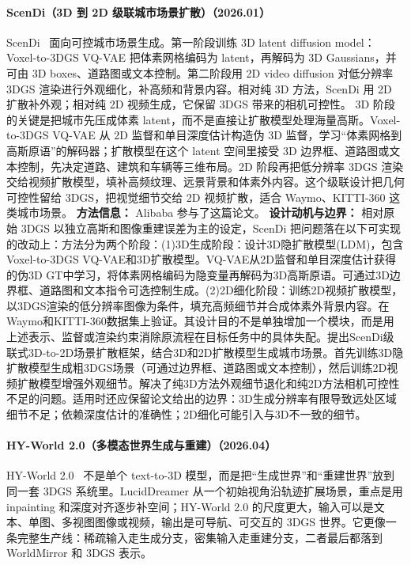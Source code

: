 \paragraph{ScenDi（3D 到 2D 级联城市场景扩散）（2026.01）}
ScenDi~\cite{2601_15221} 面向可控城市场景生成。第一阶段训练 3D latent diffusion model：Voxel-to-3DGS VQ-VAE 把体素网格编码为 latent，再解码为 3D Gaussians，并可由 3D boxes、道路图或文本控制。第二阶段用 2D video diffusion 对低分辨率 3DGS 渲染进行外观细化，补高频和背景内容。相对纯 3D 方法，ScenDi 用 2D 扩散补外观；相对纯 2D 视频生成，它保留 3DGS 带来的相机可控性。
3D 阶段的关键是把城市先压成体素 latent，而不是直接让扩散模型处理海量高斯。Voxel-to-3DGS VQ-VAE 从 2D 监督和单目深度估计构造伪 3D 监督，学习“体素网格到高斯原语”的解码器；扩散模型在这个 latent 空间里接受 3D 边界框、道路图或文本控制，先决定道路、建筑和车辆等三维布局。2D 阶段再把低分辨率 3DGS 渲染交给视频扩散模型，填补高频纹理、远景背景和体素外内容。这个级联设计把几何可控性留给 3DGS，把视觉细节交给 2D 视频扩散，适合 Waymo、KITTI-360 这类城市场景。
\textbf{方法信息：} Alibaba 参与了这篇论文。
\textbf{设计动机与边界：} 相对原始 3DGS 以独立高斯和图像重建误差为主的设定，ScenDi 把问题落在以下可实现的改动上：方法分为两个阶段：(1)3D生成阶段：设计3D隐扩散模型(LDM)，包含Voxel-to-3DGS VQ-VAE和3D扩散模型。VQ-VAE从2D监督和单目深度估计获得的伪3D GT中学习，将体素网格编码为隐变量再解码为3D高斯原语。可通过3D边界框、道路图和文本指令可选控制生成。(2)2D细化阶段：训练2D视频扩散模型，以3DGS渲染的低分辨率图像为条件，填充高频细节并合成体素外背景内容。在Waymo和KITTI-360数据集上验证。其设计目的不是单独增加一个模块，而是用上述表示、监督或渲染约束消除原流程在目标任务中的具体失配。提出ScenDi级联式3D-to-2D场景扩散框架，结合3D和2D扩散模型生成城市场景。首先训练3D隐扩散模型生成粗3DGS场景（可通过边界框、道路图或文本控制），然后训练2D视频扩散模型增强外观细节。解决了纯3D方法外观细节退化和纯2D方法相机可控性不足的问题。适用时还应保留论文给出的边界：3D生成分辨率有限导致远处区域细节不足；依赖深度估计的准确性；2D细化可能引入与3D不一致的细节。
\paragraph{HY-World 2.0（多模态世界生成与重建）（2026.04）}
HY-World 2.0~\cite{2604_14268} 不是单个 text-to-3D 模型，而是把“生成世界”和“重建世界”放到同一套 3DGS 系统里。LucidDreamer 从一个初始视角沿轨迹扩展场景，重点是用 inpainting 和深度对齐逐步补空间；HY-World 2.0 的尺度更大，输入可以是文本、单图、多视图图像或视频，输出是可导航、可交互的 3DGS 世界。它更像一条完整生产线：稀疏输入走生成分支，密集输入走重建分支，二者最后都落到 WorldMirror 和 3DGS 表示。

